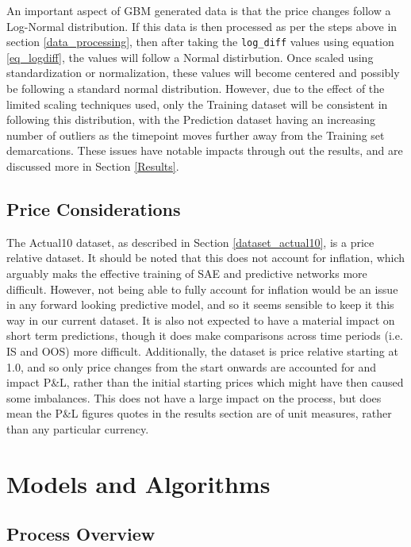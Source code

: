 \documentclass[a4paper,11pt,oneside]{article}
\theoremstyle{plain}
\theoremstyle{definition}
\begin{document}
	An important aspect of GBM generated data is that the price changes follow a Log-Normal distribution. If this data is then processed as per the steps above in section \ref{data_processing}, then after taking the \texttt{log\_diff} values using equation \eqref{eq_logdiff}, the values will follow a Normal distirbution. Once scaled using standardization or normalization, these values will become centered and possibly be following a standard normal distribution. However, due to the effect of the limited scaling techniques used, only the Training dataset will be consistent in following this distribution, with the Prediction dataset having an increasing number of outliers as the timepoint moves further away from the Training set demarcations. These issues have notable impacts through out the results, and are discussed more in Section \ref{Results}.
	
	\subsection{Price Considerations}\label{data_prices}
	
	The Actual10 dataset, as described in Section \ref{dataset_actual10}, is a price relative dataset. It should be noted that this does not account for inflation, which arguably maks the effective training of SAE and predictive networks more difficult. However, not being able to fully account for inflation would be an issue in any forward looking predictive model, and so it seems sensible to keep it this way in our current dataset. It is also not expected to have a material impact on short term predictions, though it does make comparisons across time periods (i.e. IS and OOS) more difficult. Additionally, the dataset is price relative starting at 1.0, and so only price changes from the start onwards are accounted for and impact P\&L, rather than the initial starting prices which might have then caused some imbalances. This does not have a large impact on the process, but does mean the P\&L figures quotes in the results section are of unit measures, rather than any particular currency.
	
	\newpage
	\section{Models and Algorithms}\label{Implementation}
	\subsection{Process Overview}\label{ProcessOverview}\label{imp_overview}
	
\end{document}
